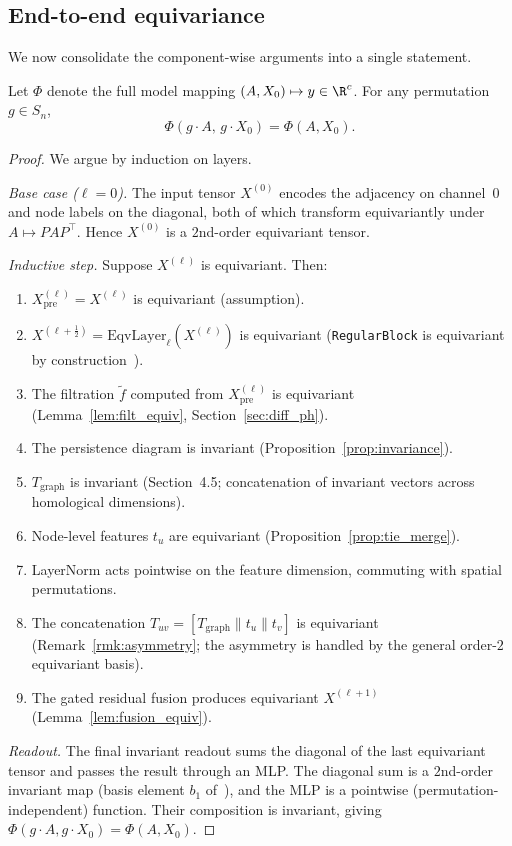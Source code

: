 \subsection{End-to-end equivariance}

We now consolidate the component-wise arguments into a single statement.

\begin{proposition}
\label{prop:end_to_end}
Let $\Phi$ denote the full model mapping $(A, X_0) \mapsto y \in \R^c$. For any permutation $g \in S_n$,
\[
    \Phi(g \cdot A,\, g \cdot X_0) = \Phi(A, X_0).
\]
\end{proposition}

\begin{proof}
We argue by induction on layers.

\emph{Base case ($\ell = 0$).} The input tensor $X^{(0)}$ encodes the adjacency on channel~$0$ and node labels on the diagonal, both of which transform equivariantly under $A \mapsto P A P^\top$. Hence $X^{(0)}$ is a $2$nd-order equivariant tensor.

\emph{Inductive step.} Suppose $X^{(\ell)}$ is equivariant. Then:
\begin{enumerate}
    \item $X^{(\ell)}_{\mathrm{pre}} = X^{(\ell)}$ is equivariant (assumption).
    \item $X^{(\ell+\frac{1}{2})} = \mathrm{EqvLayer}_\ell(X^{(\ell)})$ is equivariant (\texttt{RegularBlock} is equivariant by construction~\cite{maron2019provably}).
    \item The filtration $\tilde{f}$ computed from $X^{(\ell)}_{\mathrm{pre}}$ is equivariant (Lemma~\ref{lem:filt_equiv}, Section~\ref{sec:diff_ph}).
    \item The persistence diagram is invariant (Proposition~\ref{prop:invariance}).
    \item $T_{\mathrm{graph}}$ is invariant (Section~4.5; concatenation of invariant vectors across homological dimensions).
    \item Node-level features $t_u$ are equivariant (Proposition~\ref{prop:tie_merge}).
    \item LayerNorm acts pointwise on the feature dimension, commuting with spatial permutations.
    \item The concatenation $T_{uv} = [T_{\mathrm{graph}} \| t_u \| t_v]$ is equivariant (Remark~\ref{rmk:asymmetry}; the asymmetry is handled by the general order-$2$ equivariant basis).
    \item The gated residual fusion produces equivariant $X^{(\ell+1)}$ (Lemma~\ref{lem:fusion_equiv}).
\end{enumerate}

\emph{Readout.} The final invariant readout sums the diagonal of the last equivariant tensor and passes the result through an MLP. The diagonal sum is a $2$nd-order invariant map (basis element $b_1$ of~\cite{maron2019provably}), and the MLP is a pointwise (permutation-independent) function. Their composition is invariant, giving $\Phi(g \cdot A, g \cdot X_0) = \Phi(A, X_0)$.
\end{proof}


